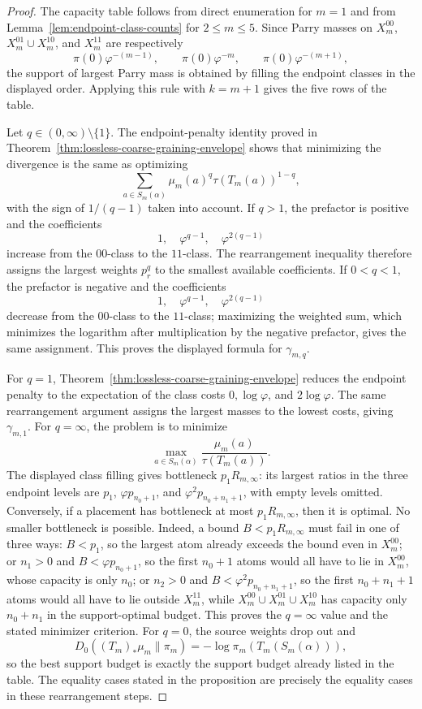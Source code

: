 \begin{proof}
The capacity table follows from direct enumeration for \(m=1\) and from
Lemma~\ref{lem:endpoint-class-counts} for \(2\le m\le5\).  Since Parry masses
on \(X_m^{00}\), \(X_m^{01}\cup X_m^{10}\), and \(X_m^{11}\) are respectively
\[
\pi(0)\varphi^{-(m-1)},\qquad
\pi(0)\varphi^{-m},\qquad
\pi(0)\varphi^{-(m+1)},
\]
the support of largest Parry mass is obtained by filling the endpoint classes
in the displayed order.  Applying this rule with \(k=m+1\) gives the five
rows of the table.

Let \(q\in(0,\infty)\setminus\{1\}\).  The endpoint-penalty identity proved in
Theorem~\ref{thm:lossless-coarse-graining-envelope} shows that minimizing the
divergence is the same as optimizing
\[
\sum_{a\in S_m(\alpha)}\mu_m(a)^q\tau(T_m(a))^{1-q},
\]
with the sign of \(1/(q-1)\) taken into account.  If \(q>1\), the prefactor is
positive and the coefficients
\[
1,\quad \varphi^{q-1},\quad \varphi^{2(q-1)}
\]
increase from the \(00\)-class to the \(11\)-class.  The rearrangement
inequality therefore assigns the largest weights \(p_r^q\) to the smallest
available coefficients.  If \(0<q<1\), the prefactor is negative and the
coefficients
\[
1,\quad \varphi^{q-1},\quad \varphi^{2(q-1)}
\]
decrease from the \(00\)-class to the \(11\)-class; maximizing the weighted
sum, which minimizes the logarithm after multiplication by the negative
prefactor, gives the same assignment.  This proves the displayed formula for
\(\gamma_{m,q}\).

For \(q=1\), Theorem~\ref{thm:lossless-coarse-graining-envelope} reduces the
endpoint penalty to the expectation of the class costs \(0,\log\varphi\), and
\(2\log\varphi\).  The same rearrangement argument assigns the largest masses
to the lowest costs, giving \(\gamma_{m,1}\).  For \(q=\infty\), the problem is
to minimize
\[
\max_{a\in S_m(\alpha)}\frac{\mu_m(a)}{\tau(T_m(a))}.
\]
The displayed class filling gives bottleneck \(p_1R_{m,\infty}\): its largest
ratios in the three endpoint levels are \(p_1\), \(\varphi p_{n_0+1}\), and
\(\varphi^2p_{n_0+n_1+1}\), with empty levels omitted.  Conversely, if a
placement has bottleneck at most \(p_1R_{m,\infty}\), then it is optimal.  No
smaller bottleneck is possible.  Indeed, a bound \(B<p_1R_{m,\infty}\) must
fail in one of three ways: \(B<p_1\), so the largest atom already exceeds the
bound even in \(X_m^{00}\); or \(n_1>0\) and \(B<\varphi p_{n_0+1}\), so the
first \(n_0+1\) atoms would all have to lie in \(X_m^{00}\), whose capacity is
only \(n_0\); or \(n_2>0\) and
\(B<\varphi^2p_{n_0+n_1+1}\), so the first \(n_0+n_1+1\) atoms would all have
to lie outside \(X_m^{11}\), while \(X_m^{00}\cup X_m^{01}\cup X_m^{10}\) has
capacity only \(n_0+n_1\) in the support-optimal budget.  This proves the
\(q=\infty\) value and the stated minimizer criterion.  For \(q=0\), the source weights
drop out and
\[
D_0((T_m)_*\mu_m\|\pi_m)=-\log\pi_m(T_m(S_m(\alpha))),
\]
so the best support budget is exactly the support budget already listed in
the table.  The equality cases stated in the proposition are precisely the
equality cases in these rearrangement steps.
\end{proof}

